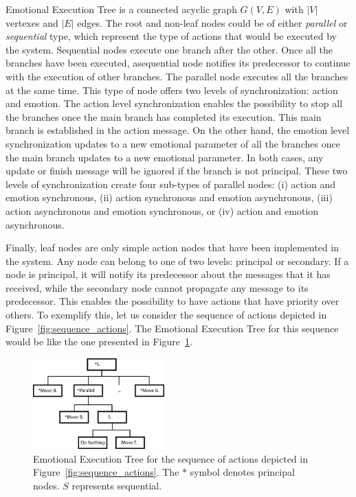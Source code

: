 Emotional Execution Tree is a connected acyclic graph $G(V,E)$ with $|V|$ vertexes and $|E|$ edges. The root and non-leaf nodes could be of either \textit{parallel} or \textit{sequential} type, which represent the type of actions that would be executed by the system. Sequential nodes execute one branch after the other. Once all the branches have been executed, asequential node notifies its predecessor to continue with the execution of other branches. The parallel node executes all the branches at the same time. This type of node offers two levels of synchronization: action and emotion. The action level synchronization enables the possibility to stop all the branches once the main branch has completed its execution. This main branch is established in the action message. On the other hand, the emotion level synchronization updates to a new emotional parameter of all the branches once the main branch updates to a new emotional parameter. %
In both cases, any update or finish message will be ignored if the branch is not principal. These two levels of synchronization create four sub-types of parallel nodes: (i) action and emotion synchronous, (ii) action synchronous and emotion asynchronous, (iii) action asynchronous and emotion synchronous, or (iv) action and emotion asynchronous. 
 
Finally, leaf nodes are only simple action nodes that have been implemented in the system. Any node can belong to one of two levels: principal or secondary. If a node is principal, it will notify its predecessor about the messages that it has received, while the secondary node cannot propagate any message to its predecessor. This enables the possibility to have actions that have priority over others. To exemplify this, let us consider the sequence of actions depicted in Figure~\ref{fig:sequence_actions}. The Emotional Execution Tree for this sequence would be like the one presented in Figure~\ref{fig:emotional_enrichment}.

\begin{figure}
	\centering
	\includegraphics[width=0.45\textwidth]{./Images/Representation.png}
	\caption{Emotional Execution Tree for the sequence of actions depicted in Figure~\ref{fig:sequence_actions}. The $*$ symbol denotes principal nodes. $S$ represents sequential.}
	\label{fig:emotional_enrichment}
\end{figure}

